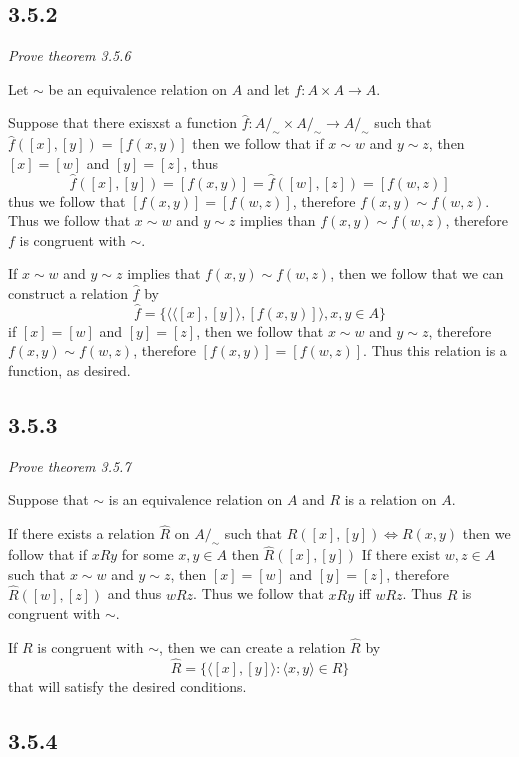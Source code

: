 \documentclass[11pt,oneside,titlepage]{book}
\newcommand{\eangle}[1]{\langle #1 \rangle}
\begin{document}
\subsection*{3.5.2}

\textit{Prove theorem 3.5.6}

Let $\sim$ be an equivalence relation on $A$ and let $f: A \times A \to A$.

Suppose that there exisxst a function $\hat{f}: A/_\sim \times A/_\sim \to A/_\sim$ such that
$\hat{f}([x], [y]) = [f(x, y)]$
then we follow that if $x \sim w$ and $y \sim z$, then $[x] = [w]$ and $[y] = [z]$, thus
$$\hat{f}([x], [y]) = [f(x, y)] = \hat{f}([w], [z]) = [f(w, z)]$$
thus we follow that $[f(x, y)] = [f(w, z)]$, therefore $f(x, y) \sim f(w, z)$.
Thus we follow that $x \sim w$ and $y \sim z$ implies than $f(x, y) \sim f(w, z)$, therefore
$f$ is congruent with $\sim$.

If $x \sim w$ and $y \sim z$ implies that $f(x, y) \sim f(w, z)$, then we follow that
we can construct a relation
$\hat{f}$  by
$$\hat{f} = \{ \eangle{\eangle{[x], [y]}, [f(x, y)]}, x, y \in A\}$$
if $[x] = [w]$ and $[y] = [z]$, then we follow that $x \sim w$ and $y \sim z$, therefore
$f(x, y) \sim f(w, z)$, therefore  $[f(x, y)] = [f(w, z)]$. Thus this relation is a function, as
desired.

\subsection*{3.5.3}

\textit{Prove theorem 3.5.7}

Suppose that $\sim$ is an equivalence relation on $A$ and $R$ is a relation on $A$.

If there exists a relation $\hat{R}$ on $A/_\sim$ such that
$\hat{R}([x], [y]) \iff R(x, y)$
then we follow that if  $xRy$ for some $x, y \in A$ then $\hat{R}([x], [y])$
If there exist $w, z \in A$ such that
$x \sim w$ and $y \sim z$, then $[x] = [w]$ and $[y] = [z]$, therefore $\hat{R}([w], [z])$
and thus $wRz$. Thus we follow that $xRy$ iff $wRz$. Thus $R$ is congruent with $\sim$.

If $R$ is congruent with $\sim$, then we can create a relation $\hat{R}$ by
$$\hat{R} = \{\eangle{[x], [y]} : \eangle{x, y} \in R\}$$
that will satisfy the desired conditions.

\subsection*{3.5.4}
\end{document}

